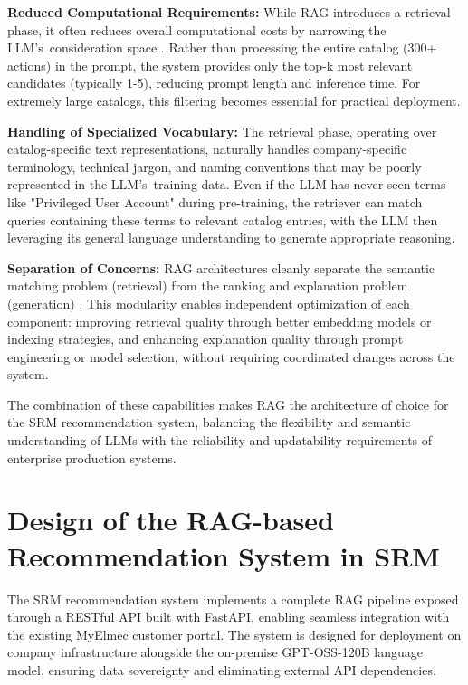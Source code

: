 \textbf{Reduced Computational Requirements:} While RAG introduces a retrieval phase, it often reduces overall computational costs by narrowing the LLM's~consideration space \cite{lewis2021retrievalaugmentedgenerationknowledgeintensivenlp}. Rather than processing the entire catalog (300+ actions) in the prompt, the system provides only the top-k most relevant candidates (typically 1-5), reducing prompt length and inference time. For extremely large catalogs, this filtering becomes essential for practical deployment.

\textbf{Handling of Specialized Vocabulary:} The retrieval phase, operating over catalog-specific text representations, naturally handles company-specific terminology, technical jargon, and naming conventions that may be poorly represented in the LLM's~training data. Even if the LLM has never seen terms like "Privileged User Account" during pre-training, the retriever can match queries containing these terms to relevant catalog entries, with the LLM then leveraging its general language understanding to generate appropriate reasoning.

\textbf{Separation of Concerns:} RAG architectures cleanly separate the semantic matching problem (retrieval) from the ranking and explanation problem (generation) \cite{lewis2021retrievalaugmentedgenerationknowledgeintensivenlp}. This modularity enables independent optimization of each component: improving retrieval quality through better embedding models or indexing strategies, and enhancing explanation quality through prompt engineering or model selection, without requiring coordinated changes across the system.

The combination of these capabilities makes RAG the architecture of choice for the SRM recommendation system, balancing the flexibility and semantic understanding of LLMs with the reliability and updatability requirements of enterprise production systems.

\section{Design of the RAG-based Recommendation System in SRM}

The SRM recommendation system implements a complete RAG pipeline exposed through a RESTful API built with FastAPI, enabling seamless integration with the existing MyElmec customer portal. The system is designed for deployment on company infrastructure alongside the on-premise GPT-OSS-120B \cite{mekrache2025ossgpt} language model, ensuring data sovereignty and eliminating external API dependencies.

